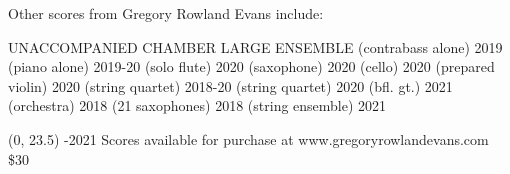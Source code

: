 \documentclass[11pt]{article}
\begin{document}

\begin{center}
\fontsize{.7cm}{1em}\selectfont Other scores from Gregory Rowland Evans include: \hfill
\end{center}
\vspace*{4\baselineskip}
{
\begin{center}
\setlength{\columnseprule}{1pt}
\setlength{\columnsep}{6em}

\begin{paracol}{3}
\fontsize{.3cm}{1em}\selectfont UNACCOMPANIED
\switchcolumn[1]
\fontsize{.3cm}{1em}\selectfont CHAMBER
\switchcolumn[2]
\fontsize{.3cm}{1em}\selectfont LARGE ENSEMBLE
\switchcolumn[0]
\fontsize{.05cm}{0.5em}  (contrabass alone) 2019
\switchcolumn[0]
\fontsize{.05cm}{0.5em}  (piano alone) 2019-20
\switchcolumn[0]
\fontsize{.05cm}{0.5em}  (solo flute) 2020
\switchcolumn[0]
\fontsize{.05cm}{0.5em}  (saxophone) 2020
\switchcolumn[0]
\fontsize{.05cm}{0.5em}  (cello) 2020
\switchcolumn[0]
\fontsize{.05cm}{0.5em}  (prepared violin) 2020
\switchcolumn[1]
\fontsize{.05cm}{0.5em}  (string quartet) 2018-20
\switchcolumn[1]
\fontsize{.05cm}{0.5em}  (string quartet) 2020
\switchcolumn[1]
\fontsize{.05cm}{0.5em}  (bfl. gt.) 2021
\switchcolumn[2]
\fontsize{.05cm}{0.5em}  (orchestra) 2018
\switchcolumn[2]
\fontsize{.05cm}{0.5em}  (21 saxophones) 2018
\switchcolumn[2]
\fontsize{.50cm}{0.5em}  (string ensemble) 2021


\end{paracol}
\end{center}
}

\begin{textblock}{23}(0, 23.5)
-2021 \hfill
Scores available for purchase at www.gregoryrowlandevans.com \hfill
\$30
\end{textblock}
\end{document}

